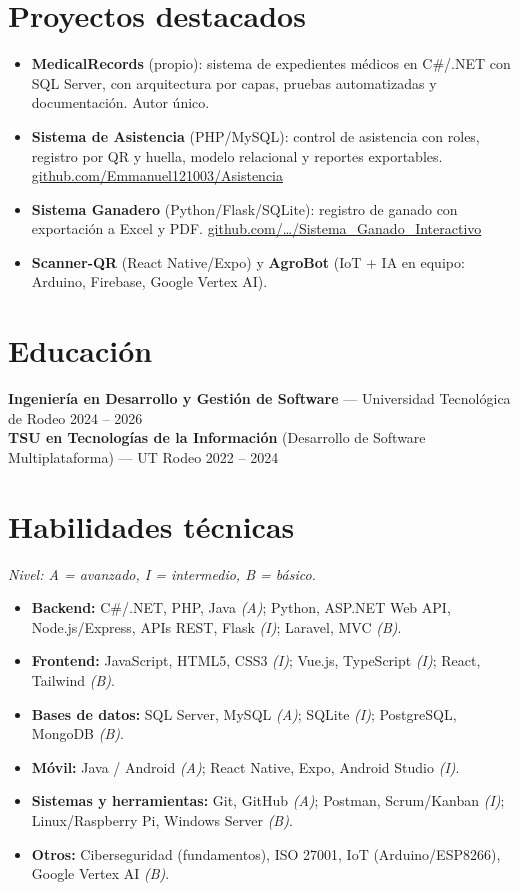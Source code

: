 \documentclass[11pt,a4paper]{article}
\begin{document}
\section{Proyectos destacados}
\begin{itemize}
  \item \textbf{MedicalRecords} (propio): sistema de expedientes médicos en C\#/.NET con SQL Server, con arquitectura por
        capas, pruebas automatizadas y documentación. Autor único.
  \item \textbf{Sistema de Asistencia} (PHP/MySQL): control de asistencia con roles, registro por QR y huella, modelo
        relacional y reportes exportables. \href{https://github.com/Emmanuel121003/Asistencia}{github.com/Emmanuel121003/Asistencia}
  \item \textbf{Sistema Ganadero} (Python/Flask/SQLite): registro de ganado con exportación a Excel y PDF.
        \href{https://github.com/Emmanuel121003/Sistema_Ganado_Interactivo}{github.com/…/Sistema\_Ganado\_Interactivo}
  \item \textbf{Scanner-QR} (React Native/Expo) y \textbf{AgroBot} (IoT + IA en equipo: Arduino, Firebase, Google Vertex AI).
\end{itemize}

\section{Educación}
\textbf{Ingeniería en Desarrollo y Gestión de Software} --- Universidad Tecnológica de Rodeo \hfill {\color{muted}\small 2024 -- 2026}\\[3pt]
\textbf{TSU en Tecnologías de la Información} (Desarrollo de Software Multiplataforma) --- UT Rodeo \hfill {\color{muted}\small 2022 -- 2024}

\section{Habilidades técnicas}
\textit{Nivel: A = avanzado, I = intermedio, B = básico.}
\begin{itemize}
  \item \textbf{Backend:} C\#/.NET, PHP, Java \textit{(A)}; Python, ASP.NET Web API, Node.js/Express, APIs REST, Flask \textit{(I)}; Laravel, MVC \textit{(B)}.
  \item \textbf{Frontend:} JavaScript, HTML5, CSS3 \textit{(I)}; Vue.js, TypeScript \textit{(I)}; React, Tailwind \textit{(B)}.
  \item \textbf{Bases de datos:} SQL Server, MySQL \textit{(A)}; SQLite \textit{(I)}; PostgreSQL, MongoDB \textit{(B)}.
  \item \textbf{Móvil:} Java / Android \textit{(A)}; React Native, Expo, Android Studio \textit{(I)}.
  \item \textbf{Sistemas y herramientas:} Git, GitHub \textit{(A)}; Postman, Scrum/Kanban \textit{(I)}; Linux/Raspberry Pi, Windows Server \textit{(B)}.
  \item \textbf{Otros:} Ciberseguridad (fundamentos), ISO 27001, IoT (Arduino/ESP8266), Google Vertex AI \textit{(B)}.
\end{itemize}
\end{document}
